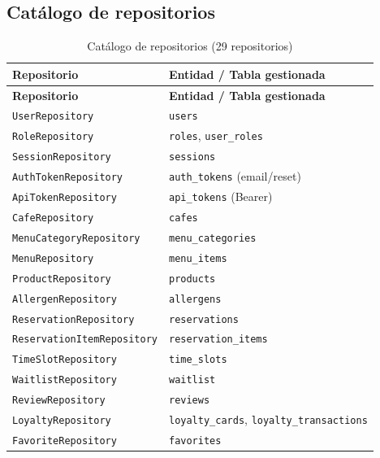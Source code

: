\documentclass[12pt,a4paper,twoside,openright]{report}
\begin{document}
\subsection{Catálogo de repositorios}
\label{subsec:repositorios}

\begin{longtable}{@{}lp{7cm}@{}}
  \caption{Catálogo de repositorios (29 repositorios)}
  \label{tab:repos}\\
  \toprule
  \textbf{Repositorio} & \textbf{Entidad / Tabla gestionada}\\
  \midrule
  \endfirsthead
  \toprule
  \textbf{Repositorio} & \textbf{Entidad / Tabla gestionada}\\
  \midrule
  \endhead
  \bottomrule
  \endfoot
  \texttt{UserRepository}                  & \texttt{users}\\
  \texttt{RoleRepository}                  & \texttt{roles}, \texttt{user\_roles}\\
  \texttt{SessionRepository}               & \texttt{sessions}\\
  \texttt{AuthTokenRepository}             & \texttt{auth\_tokens} (email/reset)\\
  \texttt{ApiTokenRepository}              & \texttt{api\_tokens} (Bearer)\\
  \texttt{CafeRepository}                  & \texttt{cafes}\\
  \texttt{MenuCategoryRepository}          & \texttt{menu\_categories}\\
  \texttt{MenuRepository}                  & \texttt{menu\_items}\\
  \texttt{ProductRepository}               & \texttt{products}\\
  \texttt{AllergenRepository}              & \texttt{allergens}\\
  \texttt{ReservationRepository}           & \texttt{reservations}\\
  \texttt{ReservationItemRepository}       & \texttt{reservation\_items}\\
  \texttt{TimeSlotRepository}              & \texttt{time\_slots}\\
  \texttt{WaitlistRepository}              & \texttt{waitlist}\\
  \texttt{ReviewRepository}                & \texttt{reviews}\\
  \texttt{LoyaltyRepository}               & \texttt{loyalty\_cards}, \texttt{loyalty\_transactions}\\
  \texttt{FavoriteRepository}              & \texttt{favorites}\\

\end{longtable}
\end{document}
